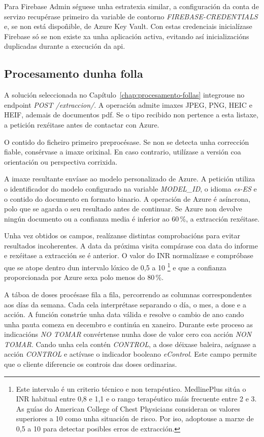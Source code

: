 Para Firebase Admin séguese unha estratexia similar, a configuración da conta de servizo recupérase primeiro da variable de contorno \textit{FIREBASE-CREDENTIALS} e, se non está dispoñible, de Azure Key Vault. Con estas credenciais inicialízase Firebase só se non existe xa unha aplicación activa, evitando así inicializacións duplicadas durante a execución da \gls{api}.

\subsection{Procesamento dunha folla}
A solución seleccionada no Capítulo~\ref{chap:procesamento-follas} integrouse no endpoint \textit{POST /extraccion/}. A operación admite imaxes JPEG, PNG, HEIC e HEIF, ademais de documentos \gls{pdf}. Se o tipo recibido non pertence a esta listaxe, a petición rexéitase antes de contactar con Azure.

O contido do ficheiro primeiro preprocésase. Se non se detecta unha corrección fiable, consérvase a imaxe orixinal. En caso contrario, utilízase a versión coa orientación ou perspectiva corrixida. 

A imaxe resultante envíase ao modelo personalizado de Azure. A petición utiliza o identificador do modelo configurado na variable \textit{MODEL\_ID}, o idioma \textit{es-ES} e o contido do documento en formato binario. A operación de Azure é asíncrona, polo que se agarda o seu resultado antes de continuar. Se Azure non devolve ningún documento ou a confianza media é inferior ao 60\,\%, a extracción rexéitase.

Unha vez obtidos os campos, realízanse distintas comprobacións para evitar resultados incoherentes. A data da próxima visita compárase coa data do informe e rexéitase a extracción se é anterior. O valor do INR normalízase e compróbase que se atope dentro dun intervalo lóxico de 0,5 a 10 \cite{medlineplusINR,holbrook2012} \footnote{Este intervalo é un criterio técnico e non terapéutico. MedlinePlus sitúa o INR habitual entre 0,8 e 1,1 e o rango terapéutico máis frecuente entre 2 e 3. As guías do American College of Chest Physicians consideran os valores superiores a 10 como unha situación de risco. Por iso, adoptouse a marxe de 0,5 a 10 para detectar posibles erros de extracción.} e que a confianza proporcionada por Azure sexa polo menos do 80\,\%.

A táboa de doses procésase fila a fila, percorrendo as columnas correspondentes aos días da semana. Cada cela interprétase separando o día, o mes, a dose e a acción. A función constrúe unha data válida e resolve o cambio de ano cando unha pauta comeza en decembro e continúa en xaneiro. Durante este proceso as indicacións \textit{NO TOMAR} convértense nunha dose de valor cero coa acción \textit{NON TOMAR}. Cando unha cela contén \textit{CONTROL}, a dose déixase baleira, asígnase a acción \textit{CONTROL} e actívase o indicador booleano \textit{eControl}. Este campo permite que o cliente diferencie os controis das doses ordinarias.

